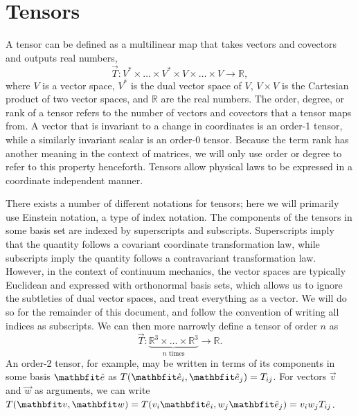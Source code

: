 \section*{Tensors}
\label{sec:tensors}

A tensor can be defined as a multilinear map that takes vectors and covectors and outputs real numbers,
\begin{equation}
    \vec{T}: V^{*} \times \ldots \times V^{*} \times V \times \ldots \times V \to \mathbb{R},
\end{equation}
where $V$ is a vector space, $V^{*}$ is the dual vector space of $V$, $V \times V$ is the Cartesian product of two vector spaces, and $\mathbb{R}$ are the real numbers.
The order, degree, or rank of a tensor refers to the number of vectors and covectors that a tensor maps from.
A vector that is invariant to a change in coordinates is an order-1 tensor, while a similarly invariant scalar is an order-0 tensor.
Because the term rank has another meaning in the context of matrices, we will only use order or degree to refer to this property henceforth.
Tensors allow physical laws to be expressed in a coordinate independent manner.

There exists a number of different notations for tensors; here we will primarily use Einstein notation, a type of index notation.
The components of the tensors in some basis set are indexed by superscripts and subscripts.
Superscripts imply that the quantity follows a covariant coordinate transformation law, while subscripts imply the quantity follows a contravariant transformation law.
However, in the context of continuum mechanics, the vector spaces are typically Euclidean and expressed with orthonormal basis sets, which allows us to ignore the subtleties of dual vector spaces, and treat everything as a vector.
We will do so for the remainder of this document, and follow the convention of writing all indices as subscripts.
We can then more narrowly define a tensor of order $n$ as
\begin{equation}
    \vec{T}: \underbrace{\mathbb{R}^{3} \times \ldots \times \mathbb{R}^{3}}_{n \textrm{ times}} \to \mathbb{R}.
\end{equation}
An order-2 tensor, for example, may be written in terms of its components in some basis $\unitvec$ as $T(\unitvec_{i}, \unitvec_{j}) = T_{ij}$.
For vectors $\vec{v}$ and $\vec{w}$ as arguments, we can write $T(\vec{v}, \vec{w}) = T(v_{i} \unitvec_{i}, w_{j} \unitvec_{j}) = v_{i} w_{j} T_{ij}$.

